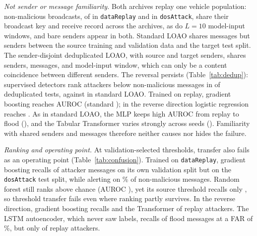 \documentclass[preprint,12pt,numafflabel]{elsarticle}
\begin{document}
\emph{Not sender or message familiarity.} Both archives replay one vehicle population: \ResOverlapArchiveMessages{} non-malicious broadcasts, of \ResOverlapArchiveBenignReplay{} in \texttt{dataReplay} and \ResOverlapArchiveBenignDoS{} in \texttt{dosAttack}, share their broadcast key and receive record across the archives, as do \ResOverlapArchiveWindows{} $L=10$ model-input windows, and \ResOverlapArchiveSenders{} bare senders appear in both. Standard LOAO shares \ResOverlapLOAOMessages{} messages but \ResOverlapLOAOSenders{} senders between the source training and validation data and the target test split. The sender-disjoint deduplicated LOAO, with \ResDedupSourceSenders{} source and \ResDedupTargetSenders{} target senders, shares \ResOverlapDedupSenders{} senders, \ResOverlapDedupMessages{} messages, and \ResOverlapDedupWindows{} model-input window, which can only be a content coincidence between different senders. The reversal persists (Table~\ref{tab:dedup}): supervised detectors rank attackers below non-malicious messages in \ResDedupBelowHalf{} of \ResDedupSupPairs{} deduplicated tests, against \ResStdBelowHalf{} in standard LOAO. Trained on replay, gradient boosting reaches AUROC \ResDedupReplayToDoSHGBAUROC{} (standard \ResLOAOReplayToDoSHGBAUROC); in the reverse direction logistic regression reaches \ResDedupDoSToReplayLogRegAUROC. As in standard LOAO, the MLP keeps high AUROC from replay to flood (\ResDedupReplayToDoSMLPAUROC), and the Tabular Transformer varies strongly across seeds (\ResDedupReplayToDoSTabTransformerAUROC). Familiarity with shared senders and messages therefore neither causes nor hides the failure.

\emph{Ranking and operating point.} At validation-selected thresholds, transfer also fails as an operating point (Table~\ref{tab:confusion}). Trained on \texttt{dataReplay}, gradient boosting recalls \ResConfLOAOReplayToDoSHGBSourceRecall{} of attacker messages on its own validation split but \ResConfLOAOReplayToDoSHGBRecall{} on the \texttt{dosAttack} test split, while alerting on \ResConfLOAOReplayToDoSHGBFAR\% of non-malicious messages. Random forest still ranks above chance (AUROC \ResLOAOReplayToDoSRandomForestAUROC), yet its source threshold recalls only \ResConfLOAOReplayToDoSRandomForestRecall, so threshold transfer fails even where ranking partly survives. In the reverse direction, gradient boosting recalls \ResConfLOAODoSToReplayHGBRecall{} and the Transformer \ResConfLOAODoSToReplayTabTransformerRecall{} of replay attackers. The LSTM autoencoder, which never saw labels, recalls \ResConfLOAOReplayToDoSLSTMAERecall{} of flood messages at a FAR of \ResConfLOAOReplayToDoSLSTMAEFAR\%, but only \ResConfLOAODoSToReplayLSTMAERecall{} of replay attackers.
\end{document}

